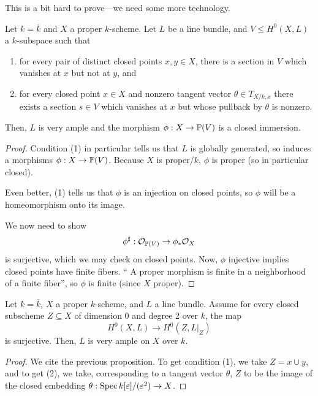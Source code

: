 \documentclass[12pt]{article}
\begin{document}
This is a bit hard to prove---we need some more technology.
\begin{prop}
    Let $k=\overline{k}$ and $X$ a proper $k$-scheme. Let $L$ be a line bundle, and $V\leq H^0(X,L)$ a $k$-subspace such that
    \begin{enumerate}[(1)]
        \item for every pair of distinct closed points $x,y\in X$, there is a section in $V$ which vanishes at $x$ but not at $y$, and
        \item for every closed point $x\in X$ and nonzero tangent vector $\theta \in T_{X/k,x}$ there exists a section $s\in V$ which vanishes at $x$ but whose pullback by $\theta$ is nonzero.
    \end{enumerate}
    Then, $L$ is very ample and the morphism $\phi:X \to \P(V)$ is a closed immersion.
\end{prop}
\begin{proof}
    Condition (1) in particular tells us that $L$ is globally generated, so induces a morphisms $\phi:X\to \P(V)$. Because $X$ is proper/$k$, $\phi$ {\color{red} is proper} (so in particular closed).
    
    Even better, (1) tells us that $\phi$ is an injection on closed points, so $\phi$ will be a homeomorphism onto its image.

    We now need to show
    \[\phi^\sharp: \cO_{\P(V)} \to \phi_* \cO_X\]
    is surjective, which we may check on closed points. Now, $\phi$ injective implies closed points have finite fibers. ``{\color{red} A proper morphism is finite in a neighborhood of a finite fiber}'', so $\phi$ is finite (since $X$ proper).

\end{proof}

\begin{cor}
    Let $k=\overline{k}$, $X$ a proper $k$-scheme, and $L$ a line bundle. Assume for every closed subscheme $Z\subseteq X$ of dimension 0 and degree 2 over $k$, the map
    \[H^0(X,L) \to H^0(Z,L|_Z)\]
    is surjective. Then, $L$ is very ample on $X$ over $k$.
\end{cor}

\begin{proof}
    We cite the previous proposition. To get condition (1), we take $Z=x\cup y$, and to get (2), we take, corresponding to a tangent vector $\theta$, $Z$ to be the image of the closed embedding $\theta: \operatorname{Spec} k[\varepsilon]/(\varepsilon^2) \to X$.
\end{proof}
\end{document}
